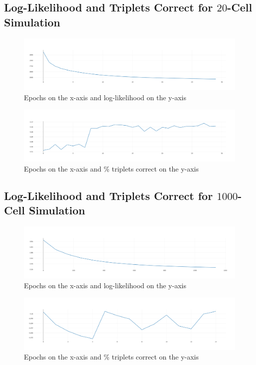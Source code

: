 \documentclass{article}
\begin{document}
\subsection*{Log-Likelihood and Triplets Correct for $20$-Cell Simulation}

\begin{figure}[h]
  \label{fig:loss_20}
  \includegraphics[width=\linewidth]{images/loss_20.png}
  \caption{Epochs on the x-axis and log-likelihood on the y-axis}
\end{figure}

\begin{figure}[h]
  \label{fig:tc_20}
  \includegraphics[width=\linewidth]{images/tc_20.png}
  \caption{Epochs on the x-axis and \% triplets correct on the y-axis}
\end{figure}

\subsection*{Log-Likelihood and Triplets Correct for $1000$-Cell Simulation}

\begin{figure}[h]
  \label{fig:loss_1000}
  \includegraphics[width=\linewidth]{images/loss_1000.png}
  \caption{Epochs on the x-axis and log-likelihood on the y-axis}
\end{figure}

\begin{figure}[h]
  \label{fig:tc_1000}
  \includegraphics[width=\linewidth]{images/tc_1000.png}
  \caption{Epochs on the x-axis and \% triplets correct on the y-axis}
\end{figure}
\end{document}

